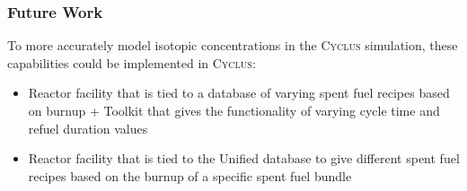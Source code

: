 \begin{frame}
    \frametitle{Future Work}
          To more accurately model isotopic concentrations in the \textsc{Cyclus} simulation, 
          these capabilities could be implemented in \textsc{Cyclus}:
          \begin{itemize}
              \item Reactor facility that is tied to a database of varying spent fuel recipes based on burnup + Toolkit that gives the functionality of varying cycle time and refuel duration values 
              \item Reactor facility that is tied to the Unified database to give different spent fuel recipes based on the burnup of a specific spent fuel bundle
          \end{itemize} 
          
  \end{frame}
  